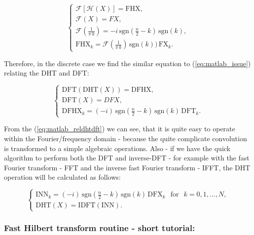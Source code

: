 \documentclass[12pt,twoside,a4paper]{article}
\numberwithin{equation}{subsection}
\numberwithin{figure}{subsection}
\begin{document}
\begin{equation} \label{eq:matlab_issue}
	\begin{cases}
	 \mathcal{F} \left[\mathcal{H}(X)\right] = \mathrm{FHX}, \\
	 \mathcal{F} (X) = FX, \\
	 \mathcal{F}(\frac {1}{\pi \, k}) = - i\,\mathrm{sgn}(\frac {n}{2} - k)\,\mathrm{sgn}(k), \\
	 \mathrm{FHX}_k = \mathcal{F}(\frac {1}{\pi \,k}) \, \mathrm{sgn}(k)) \, \mathrm{FX}_k.
	\end{cases}
\end{equation}

Therefore, in the discrete case we find the similar equation to (\ref{eq:matlab_issue}) relating the DHT and DFT:

\begin{equation} \label{eq:matlab_reldhtdft}
	\begin{cases}
		\mathrm{DFT}(\mathrm{DHT}(X)) = \mathrm{DFHX}, \\
		\mathrm{DFT}(X) = DFX, \\
		\mathrm{DFHX}_k = ( -i) \, \mathrm{sgn}(\frac{n}{2} - k) \, \mathrm{sgn}(k) \, \mathrm{DFT}_k.
	\end{cases}
\end{equation}

From the (\ref{eq:matlab_reldhtdft}) we can see, that it is quite easy to operate within the Fourier/frequency domain - because the
quite complicate convolution is transformed to a simple algebraic operations. Also - if we have the quick algorithm to perform both
the DFT and inverse-DFT - for example with the fast Fourier transform - FFT and the inverse fast Fourier transform - IFFT, the DHT
operation will be calculated as follows:

\begin{equation} \label{eq:matlab_fulldhthdf}
	\begin{cases}
		\mathrm{INN}_k = (-i) \, \mathrm{sgn}(\frac{n}{2}-k) \, \mathrm{sgn}(k) \, \mathrm{DFX}_k \, \ \mbox{ for } \ \, k=0,1,\ldots, N, \\
		\mathrm{DHT}(X) = \mathrm{IDFT}(\mathrm{INN}).  
	\end{cases}
\end{equation}

\subsubsection*{Fast Hilbert transform routine - short tutorial:}
\end{document}
